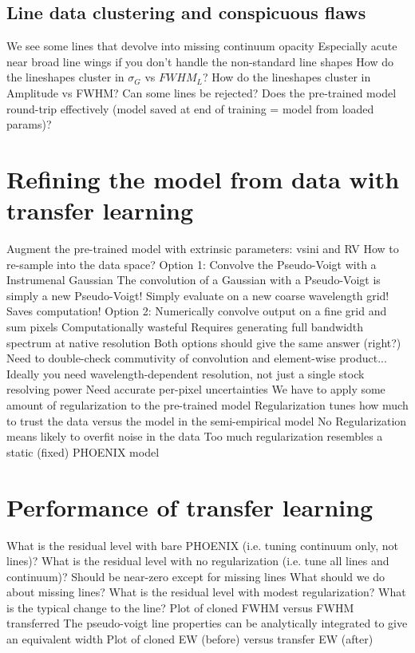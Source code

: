 \documentclass[modern]{aastex631}
\begin{document}
\subsection{Line data clustering and conspicuous flaws}
\begin{outline}
  \1 We see some lines that devolve into missing continuum opacity
  \1 Especially acute near broad line wings if you don't handle the non-standard line shapes
  \1 How do the lineshapes cluster in $\sigma_G$ vs $FWHM_L$?
  \1 How do the lineshapes cluster in Amplitude vs FWHM? Can some lines be rejected?
  \1 Does the pre-trained model round-trip effectively (model saved at end of training = model from loaded params)?
\end{outline}


\section{Refining the model from data with transfer learning}
\begin{outline}
  \1 Augment the pre-trained model with extrinsic parameters:
  \2 vsini and RV
  \1 How to re-sample into the data space?
  \1 Option 1: Convolve the Pseudo-Voigt with a Instrumenal Gaussian
  \2 The convolution of a Gaussian with a Pseudo-Voigt is simply a new Pseudo-Voigt!
  \2 Simply evaluate on a new coarse wavelength grid!  Saves computation!
  \1 Option 2: Numerically convolve output on a fine grid and sum pixels
  \2 Computationally wasteful
  \2 Requires generating full bandwidth spectrum at native resolution
  \1 Both options should give the same answer (right?)
  \2 Need to double-check commutivity of convolution and element-wise product...
  \1 Ideally you need wavelength-dependent resolution, not just a single stock resolving power
  \1 Need accurate per-pixel uncertainties
  \1 We have to apply some amount of regularization to the pre-trained model
  \2 Regularization tunes how much to trust the data versus the model in the semi-empirical model
  \2 No Regularization means likely to overfit noise in the data
  \2 Too much regularization resembles a static (fixed) PHOENIX model
\end{outline}

\section{Performance of transfer learning}
\begin{outline}
  \1 What is the residual level with bare PHOENIX (i.e. tuning continuum only, not lines)?
  \1 What is the residual level with no regularization (i.e. tune all lines and continuum)?
  \2 Should be near-zero except for missing lines
  \2  What should we do about missing lines?
  \1 What is the residual level with modest regularization?  What is the typical change to the line?
  \2 Plot of cloned FWHM versus FWHM transferred
  \2 The pseudo-voigt line properties can be analytically integrated to give an equivalent width
  \2 Plot of cloned EW (before) versus transfer EW (after)
\end{outline}
\end{document}
